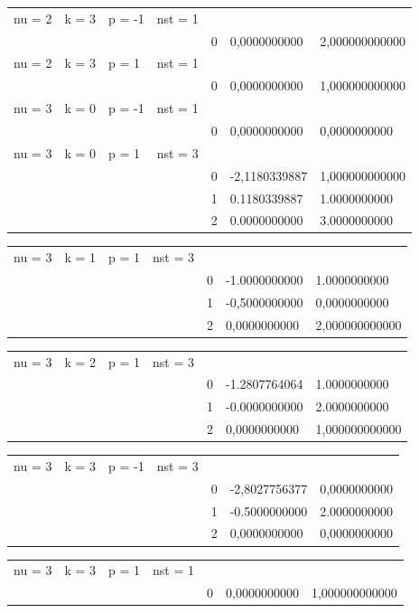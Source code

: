 \documentclass[11pt]{article}
\begin{document}
\begin{tabular}{lllllll}    
nu = 2 & k = 3 & p = -1 & nst = 1 & & & \\
    & & & & 0 & 0,0000000000 & 2,000000000000 \\
nu = 2 & k = 3 & p = 1 & nst = 1 & & & \\
    & & & & 0 & 0,0000000000 & 1,000000000000 \\
nu = 3 & k = 0 & p = -1 & nst = 1 & & & \\
    & & & & 0 & 0,0000000000 & 0,0000000000 \\
nu = 3 & k = 0 & p = 1 & nst = 3 & & & \\
    & & & & 0 & -2,1180339887 & 1,000000000000 \\
    & & & & 1 & 0.1180339887 & 1.0000000000 \\
    & & & & 2 & 0.0000000000 & 3.0000000000 \\
\end{tabular}

\begin{tabular}{lllllll}    
nu = 3 & k = 1 & p = 1 & nst = 3 & & & \\
    & & & & 0 & -1.0000000000 & 1.0000000000\\
    & & & & 1 & -0,5000000000 & 0,0000000000\\
    & & & & 2 & 0,0000000000 & 2,000000000000\\
\end{tabular}

\begin{tabular}{lllllll}    
nu = 3 & k = 2 & p = 1 & nst = 3 & & & \\
    & & & & 0 & -1.2807764064 & 1.0000000000\\
    & & & & 1 & -0.0000000000 & 2.0000000000 \\
    & & & & 2 & 0,0000000000 & 1,000000000000\\
\end{tabular}

\begin{tabular}{lllllll}    
nu = 3 & k = 3 & p = -1 & nst = 3 & & & \\
    & & & & 0 & -2,8027756377 & 0,0000000000\\
    & & & & 1 & -0.5000000000 & 2.0000000000\\
    & & & & 2 & 0,0000000000 & 0,0000000000\\
\end{tabular}

\begin{tabular}{lllllll}    
nu = 3 & k = 3 & p = 1 & nst = 1 & & & \\
    & & & & 0 & 0,0000000000 & 1,000000000000 \\
\end{tabular}\\
\end{document}
